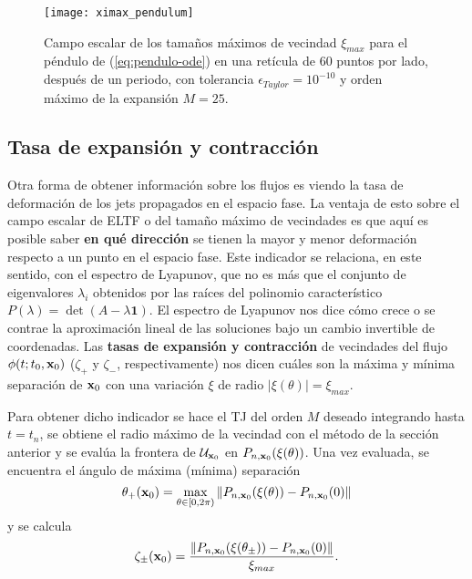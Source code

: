 \begin{figure}[h!]
 \centering
 \texttt{[image: ximax\_pendulum]}
 \caption{Campo escalar de los tamaños máximos de vecindad $\xi_{max}$ para el péndulo de (\ref{eq:pendulo-ode}) en una retícula de $60$ puntos por lado, después de un periodo, con tolerancia $\epsilon_{Taylor} = 10^{-10}$ y orden máximo de la expansión $M = 25$.}
 \label{fig:ximax_pendulum}
\end{figure}


\subsection{Tasa de expansión y contracción}
\label{sec:contraccion_expansion}

Otra forma de obtener información sobre los flujos es viendo la tasa de deformación de los jets propagados en el espacio fase. La ventaja de esto sobre el campo escalar de ELTF o del tamaño máximo de vecindades es que aquí es posible saber \textbf{en qué dirección} se tienen la mayor y menor deformación respecto a un punto en el espacio fase. Este indicador se relaciona, en este sentido, con el espectro de Lyapunov, que no es más que el conjunto de eigenvalores $\lambda_i$ obtenidos por las raíces del polinomio característico $P(\lambda) = \det(A - \lambda\mathbf{1})$. El espectro de Lyapunov nos dice cómo crece o se contrae la aproximación lineal de las soluciones bajo un cambio invertible de coordenadas. Las \textbf{tasas de expansión y contracción} de vecindades del flujo $\phi(t;t_0,\mathbf{x}_0)$ ($\zeta_+$ y $\zeta_-$, respectivamente) nos dicen cuáles son la máxima y mínima separación de $\mathbf{x}_0$ con una variación $\xi$ de radio $|\xi(\theta)| = \xi_{max}$.

Para obtener dicho indicador se hace el TJ del orden $M$ deseado integrando hasta $t = t_n$, se obtiene el radio máximo de la vecindad con el método de la sección anterior y se evalúa la frontera de $\mathcal{U}_{\mathbf{x}_0}$ en $P_{n,\mathbf{x}_0}(\xi(\theta))$. Una vez evaluada, se encuentra el ángulo de máxima (mínima) separación 
\begin{equation}
 \theta_{+}(\mathbf{x}_0) = \max_{\theta \in [0,2\pi)} \left\lVert P_{n,\mathbf{x}_0}(\xi(\theta)) - P_{n,\mathbf{x}_0}(0) \right\rVert
\end{equation} 
y se calcula 
\begin{equation}
 \zeta_{\pm}(\mathbf{x}_0) = \frac{ \left\lVert P_{n,\mathbf{x}_0}(\xi(\theta_{\pm})) - P_{n,\mathbf{x}_0}(0)\right\rVert }{\xi_{max}}.
 \label{eq:max_min_rate}
\end{equation}


